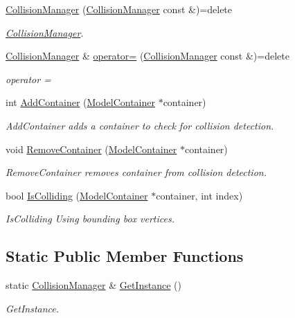 \begin{DoxyCompactItemize}
\item 
\hypertarget{class_collision_manager_a31a5f57dc2974068f3a8460710fcb129}{}\hyperlink{class_collision_manager_a31a5f57dc2974068f3a8460710fcb129}{Collision\+Manager} (\hyperlink{class_collision_manager}{Collision\+Manager} const \&)=delete\label{class_collision_manager_a31a5f57dc2974068f3a8460710fcb129}

\begin{DoxyCompactList}\small\item\em \hyperlink{class_collision_manager}{Collision\+Manager}. \end{DoxyCompactList}\item 
\hyperlink{class_collision_manager}{Collision\+Manager} \& \hyperlink{class_collision_manager_aad2b15b4b3477b30c5a4762d539f6074}{operator=} (\hyperlink{class_collision_manager}{Collision\+Manager} const \&)=delete
\begin{DoxyCompactList}\small\item\em operator = \end{DoxyCompactList}\item 
int \hyperlink{class_collision_manager_af89588cea264c9a154955ce269725f8d}{Add\+Container} (\hyperlink{class_model_container}{Model\+Container} $\ast$container)
\begin{DoxyCompactList}\small\item\em Add\+Container adds a container to check for collision detection. \end{DoxyCompactList}\item 
void \hyperlink{class_collision_manager_af57c222f9832682b7742de3863cca237}{Remove\+Container} (\hyperlink{class_model_container}{Model\+Container} $\ast$container)
\begin{DoxyCompactList}\small\item\em Remove\+Container removes container from collision detection. \end{DoxyCompactList}\item 
bool \hyperlink{class_collision_manager_a039ee08a27ee8d3390f29501900036fa}{Is\+Colliding} (\hyperlink{class_model_container}{Model\+Container} $\ast$container, int index)
\begin{DoxyCompactList}\small\item\em Is\+Colliding Using bounding box vertices. \end{DoxyCompactList}\end{DoxyCompactItemize}
\subsection*{Static Public Member Functions}
\begin{DoxyCompactItemize}
\item 
static \hyperlink{class_collision_manager}{Collision\+Manager} \& \hyperlink{class_collision_manager_a02b247c273929839c9957ed08073597f}{Get\+Instance} ()
\begin{DoxyCompactList}\small\item\em Get\+Instance. \end{DoxyCompactList}\end{DoxyCompactItemize}


